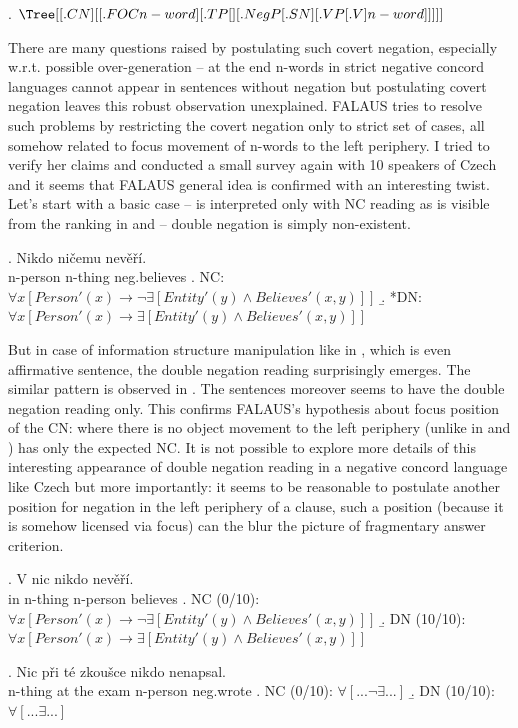 \documentclass[12pt]{scrartcl}
\begin{document}
\ex.
\(\Tree[[.CN ] [[.FOC n-word ][.TP [] [.NegP [. SN ] [.VP [.V ] n-word ]]]]]\)

There are many questions raised by postulating such covert negation, especially w.r.t. possible over-generation -- at the end n-words in strict negative concord languages cannot appear in sentences without negation but postulating covert negation leaves this robust observation unexplained. FALAUS tries to resolve such problems by restricting the covert negation only to strict set of cases, all somehow related to focus movement of n-words to the left periphery. I tried to verify her claims and conducted a small survey again with 10 speakers of Czech and it seems that FALAUS general idea is confirmed with an interesting twist. Let's start with a basic case -- \Next is interpreted only with NC reading as is visible from the ranking in \Next[a] and \Next[b] -- double negation is simply non-existent. 

\ex. Nikdo ničemu nevěří.\\
n-person n-thing neg.believes \a. NC:
\(\forall x[Person'(x) \rightarrow \neg \exists[Entity'(y) \wedge Believes'(x,y)]]\)
\b. *DN:
\(\forall x[Person'(x) \rightarrow \exists[Entity'(y) \wedge Believes'(x,y)]]\)

But in case of information structure manipulation like in \Next, which is even affirmative sentence, the double negation reading surprisingly emerges. The similar pattern is observed in \NNext. The sentences moreover seems to have the double negation reading only. This confirms FALAUS's hypothesis about focus position of the CN: \Last where there is no object movement to the left periphery (unlike in \Next and \NNext) has only the expected NC. It is not possible to explore more details of this interesting appearance of double negation reading in a negative concord language like Czech but more importantly: it seems to be reasonable to postulate another position for negation in the left periphery of a clause, such a position (because it is somehow licensed via focus) can the blur the picture of fragmentary answer criterion.

\ex. V nic nikdo nevěří.\\
in n-thing n-person believes \a. NC (0/10):
\(\forall x[Person'(x) \rightarrow \neg \exists[Entity'(y) \wedge Believes'(x,y)]]\)
\b. DN (10/10):
\(\forall x[Person'(x) \rightarrow \exists[Entity'(y) \wedge Believes'(x,y)]]\)


\ex. Nic při té zkoušce nikdo nenapsal.\\
n-thing at the exam n-person neg.wrote \a. NC (0/10):
\(\forall [... \neg \exists ...]\) \b. DN (10/10):
\(\forall [... \exists ...]\)
\end{document}
